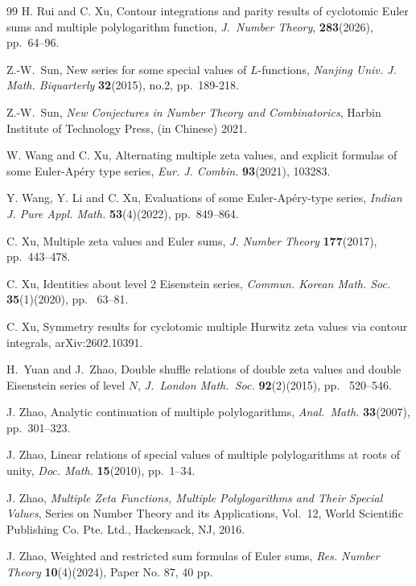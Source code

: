\documentclass[11pt]{article}
\theoremstyle{plain}
\theoremstyle{definition}
\begin{document}
\begin{thebibliography}{99}
H. Rui and C. Xu, Contour integrations and parity results of cyclotomic Euler sums and multiple polylogarithm function, \emph{J.\ Number Theory}, \textbf{283}(2026), pp.\ 64--96.

Z.-W.\ Sun, New series for some special values of $L$-functions, \emph{Nanjing Univ. J. Math. Biquarterly} \textbf{32}(2015), no.2, pp.\ 189-218.

Z.-W.\ Sun, \emph{New Conjectures in Number Theory and Combinatorics}, Harbin Institute of Technology Press, (in Chinese) 2021.

W. Wang and C. Xu, Alternating multiple zeta values, and explicit formulas of some Euler-Ap\'ery type series, \emph{Eur. J. Combin.} {\bf 93}(2021), 103283.

Y. Wang, Y. Li and C. Xu, Evaluations of some Euler-Ap\'ery-type series, \emph{Indian J. Pure Appl. Math.} \textbf{53}(4)(2022), pp.\ 849--864.

C. Xu, Multiple zeta values and Euler sums, \emph{J. Number Theory} \textbf{177}(2017), pp.\ 443--478.

C. Xu, Identities about level 2 Eisenstein series, \emph{Commun. Korean Math. Soc.}  \textbf{35}(1)(2020), pp. \ 63--81.

C. Xu, Symmetry results for cyclotomic multiple Hurwitz zeta values via contour integrals, arXiv:2602.10391.

H.\ Yuan and J.\ Zhao, Double shuffle relations of double zeta values
and double Eisenstein series of level $N$,
\emph{J.\ London Math.\ Soc.}  \textbf{92}(2)(2015), pp. \ 520--546.

J. Zhao, Analytic continuation of multiple polylogarithms, \emph{Anal.\ Math.} \textbf{33}(2007), pp.\ 301--323.

J. Zhao, Linear relations of special values of multiple polylogarithms at roots of unity, \emph{Doc. Math.} \textbf{15}(2010), pp.\ 1--34.

J. Zhao, \emph{Multiple Zeta Functions, Multiple Polylogarithms and Their Special Values}, Series on Number
Theory and its Applications, Vol.~12, World Scientific Publishing Co. Pte. Ltd., Hackensack, NJ, 2016.

J. Zhao, Weighted and restricted sum formulas of Euler sums, \emph{Res. Number Theory} \textbf{10}(4)(2024), Paper No. 87, 40 pp.

\end{thebibliography}
\end{document}
